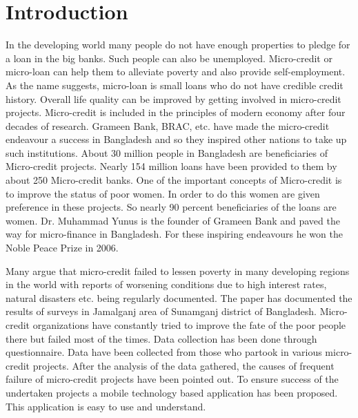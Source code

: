\documentclass{report}
\begin{document}
\chapter{Introduction}
In the developing world many people do not have enough properties to pledge for a loan in the big banks. Such people can also be unemployed. Micro-credit or micro-loan can help them to alleviate poverty and also provide self-employment. As the name suggests, micro-loan is small loans who do not have credible credit history. Overall life quality can be improved by getting involved in micro-credit projects.\cite{2}
Micro-credit is included in the principles of modern economy after four decades of research. Grameen Bank, BRAC, etc. have made the micro-credit endeavour a success in Bangladesh and so they inspired other nations to take up such institutions. About 30 million people in Bangladesh  are beneficiaries of Micro-credit projects. Nearly 154 million loans have been provided to them by about 250 Micro-credit banks. \cite{3}
One of the important  concepts of Micro-credit is to improve the status of poor women. In order to do this women are given preference in these projects. So nearly 90 percent beneficiaries of the loans are women.\cite{4}
Dr. Muhammad Yunus is the founder of Grameen Bank and paved the way for micro-finance in Bangladesh. For these inspiring endeavours he won the Noble Peace Prize in 2006. 

 Many argue that micro-credit failed to lessen poverty in many developing regions in the world with reports of worsening conditions due to high interest rates, natural disasters etc. being regularly documented. \cite{5} \cite{6}
The paper has documented the results of surveys in Jamalganj area of Sunamganj district of Bangladesh.
Micro-credit organizations have constantly tried to improve the fate of the poor people there but failed most of the times. Data collection has been done through questionnaire. Data have been collected from those who partook in various micro-credit projects. After the analysis of the data gathered, the causes of frequent failure of micro-credit projects have been pointed out. To ensure success of the undertaken projects a  mobile technology based application has been proposed. This application is easy to use and understand.
\newpage
\end{document}
